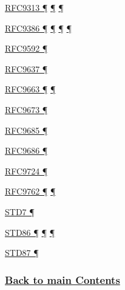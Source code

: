\documentclass[
]{article}
\begin{document}
\hyperref[coexistence-with-legacy-ipv4]{RFC9313 ¶}
\hyperref[dual-stack-scenarios]{¶}
\hyperref[translation-and-ipv4-as-a-service]{¶}

\hyperref[dual-stack-scenarios]{RFC9386 ¶}
\hyperref[deployment-by-carriers]{¶}
\hyperref[deployment-in-the-enterprise]{¶} \hyperref[status]{¶}

\hyperref[addresses]{RFC9592 ¶}

\hyperref[addresses]{RFC9637 ¶}

\hyperref[managed-configuration]{RFC9663 ¶}
\hyperref[prefix-per-host]{¶}

\hyperref[extension-headers-and-options]{RFC9673 ¶}

\hyperref[address-resolution]{RFC9685 ¶}

\hyperref[address-and-prefix-management]{RFC9686 ¶}

\hyperref[address-and-prefix-management]{RFC9724 ¶}

\hyperref[managed-configuration]{RFC9762 ¶}
\hyperref[prefix-per-host]{¶}

\hyperref[transport-protocols]{STD7 ¶}

\hyperref[ipv6-basic-technology]{STD86 ¶}
\hyperref[extension-headers-and-options]{¶} \hyperref[markdown-usage]{¶}

\hyperref[extension-headers-and-options]{STD87 ¶}

\subsubsection{\texorpdfstring{\hyperref[list-of-contents]{Back to main
Contents}}{Back to main Contents}}\label{back-to-main-contents-13}

\pagebreak
\end{document}
